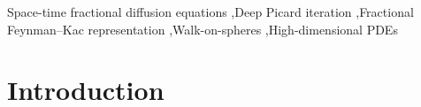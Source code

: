 \documentclass[a4paper,fleqn]{cas-sc}
\begin{document}

\begin{keywords}
Space-time fractional diffusion equations \sep Deep Picard iteration \sep Fractional Feynman--Kac representation \sep Walk-on-spheres \sep High-dimensional PDEs
\end{keywords}

\maketitle

\section{Introduction}
\end{document}
